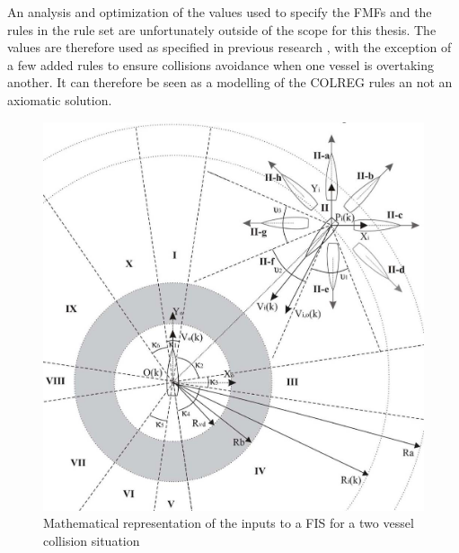 An analysis and optimization of the values used to specify the FMFs and the rules in the rule set are unfortunately outside of the scope for this thesis. The values are therefore used as specified in previous research \cite{perera2012intelligent}, with the exception of a few added rules to ensure collisions avoidance when one vessel is overtaking another. It can therefore be seen as a modelling of the COLREG rules an not an axiomatic solution.


\begin{figure}[H]
    \centering
    \includegraphics[width=\linewidth]{Figures/model}
    \caption{Mathematical representation of the inputs to a FIS for a two vessel collision situation\cite{perera2012intelligent}}
    \label{fig:model}
\end{figure}

